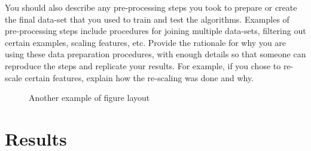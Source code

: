 \documentclass[letterpaper]{article} %
\begin{document}
You should also describe any pre-processing steps you took to prepare or create the final data-set that you used to train and test the algorithms.  Examples of pre-processing steps include procedures for joining multiple data-sets, filtering out certain examples, scaling features, etc.  Provide the rationale for why you are using these data preparation procedures, with enough details so that someone can reproduce the steps and replicate your results.   For example, if you chose to re-scale certain features, explain how the re-scaling was done and why.   



\begin{figure}[t!]
\centering
{}\hfill
{}\hfill
{}\hfill
{}\hfill
\caption{Another example of figure layout}
\label{fig:figures_across}
\end{figure}


\section{Results}
\end{document}
